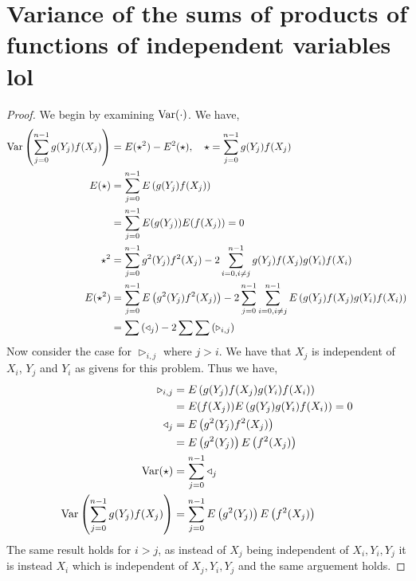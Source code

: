 \documentclass{article}
\begin{document}
\section{Variance of the sums of products of functions of independent
variables lol}
    \begin{proof}
        We begin by examining $\text{Var}(\cdot)$. We have, 
        \begin{align*}
            \text{Var}\left(\sum_{j=0}^{n-1} g(Y_j)f(X_j)\right) &= E(\star^2) -
            E^2(\star), \quad \star = \sum_{j=0}^{n-1} g(Y_j)f(X_j)
            \\
            E(\star) &= \sum_{j=0}^{n-1}E\left(g(Y_j)f(X_j)\right)
            \\
            &= \sum_{j=0}^{n-1}E(g(Y_j))E(f(X_j)) = 0
            \\
            \star^2 &= \sum_{j=0}^{n-1} g^2(Y_j)f^2(X_j) - 2\sum_{i=0,i\ne
            j}^{n-1} g(Y_j)f(X_j)g(Y_i)f(X_i)
            \\
            E(\star^2) &= \sum_{j=0}^{n-1} E\left(g^2(Y_j)f^2(X_j)\right) -
            2\sum_{j=0}^{n-1}\sum_{i=0,i\ne j}^{n-1}
            E\left(g(Y_j)f(X_j)g(Y_i)f(X_i)\right)
            \\
            &= \sum\left(\triangleleft_j\right) -2 \sum\sum\left(\triangleright_{i,j}\right)
        \end{align*}
        Now consider the case for $\triangleright_{i,j}$ where $j>i$. We have that
        $X_j$ is independent of $X_i$, $Y_j$ and $Y_i$ as givens for this
        problem. Thus we have, 
        \begin{align*}
            \triangleright_{i,j} &= E\left(g(Y_j)f(X_j)g(Y_i)f(X_i)\right)
            \\
            &= E(f(X_j))E\left(g(Y_j)g(Y_i)f(X_i)\right) = 0 
            \\
            \triangleleft_j &= E\left(g^2(Y_j)f^2(X_j)\right)
            \\
            &= E\left(g^2(Y_j)\right)E\left(f^2(X_j)\right)
            \\
            \text{Var}(\star) &= \sum_{j=0}^{n-1} \triangleleft_j
            \\
            \text{Var}\left(\sum_{j=0}^{n-1} g(Y_j)f(X_j)\right) &=
            \sum_{j=0}^{n-1} E\left(g^2(Y_j)\right)E\left(f^2(X_j)\right)
        \end{align*}
        The same result holds for $i > j$, as instead of $X_j$ being independent
        of $X_i, Y_i, Y_j$ it is instead $X_i$ which is independent of $X_j,
        Y_i, Y_j$ and the same arguement holds. 
    \end{proof}
\end{document}
